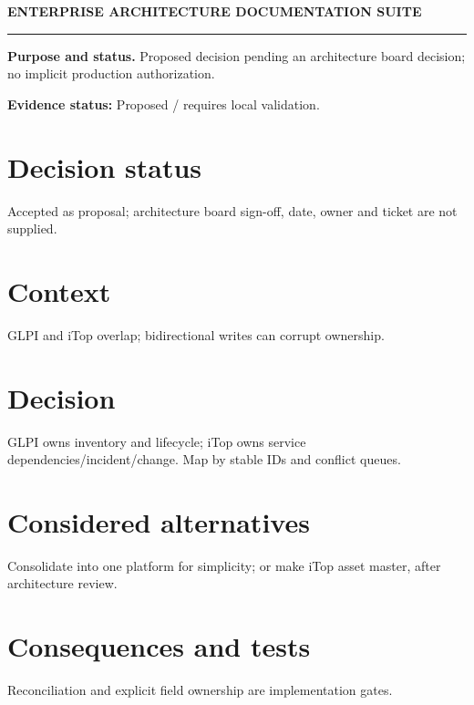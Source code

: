 \documentclass[10pt,letterpaper]{article}
\begin{document}
\begin{center}
{\large\bfseries\color{teal} ENTERPRISE ARCHITECTURE DOCUMENTATION SUITE}\par
{}\par
{}\par
\end{center}
\vspace{8pt}\hrule\vspace{12pt}
\textbf{Purpose and status.} Proposed decision pending an architecture board decision; no implicit production authorization.\par
\textbf{Evidence status:} Proposed / requires local validation.\par
\section{Decision status}
Accepted as proposal; architecture board sign-off, date, owner and ticket are not supplied.\par
\section{Context}
GLPI and iTop overlap; bidirectional writes can corrupt ownership.\par
\section{Decision}
GLPI owns inventory and lifecycle; iTop owns service dependencies/incident/change. Map by stable IDs and conflict queues.\par
\section{Considered alternatives}
Consolidate into one platform for simplicity; or make iTop asset master, after architecture review.\par
\section{Consequences and tests}
Reconciliation and explicit field ownership are implementation gates.\par
\end{document}
